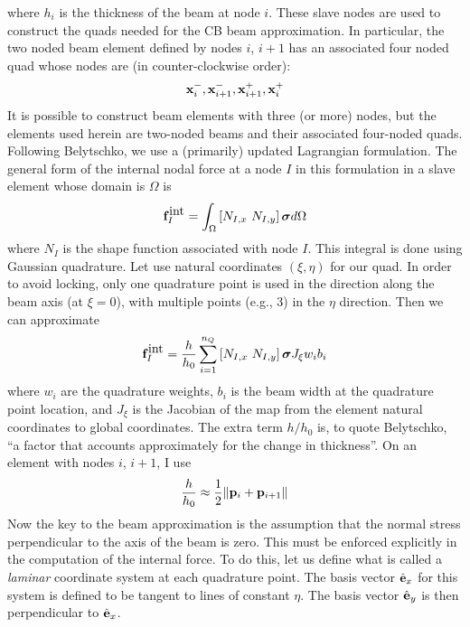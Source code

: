 \documentclass{article}
\begin{document}
where $h_i$ is the thickness of the beam at node $i$.
These slave nodes are used to construct the quads needed for the CB beam approximation.
In particular, the two noded beam element defined by nodes $i$, $i+1$ has an associated four noded quad whose nodes are (in counter-clockwise order):
\[ {\bf x}_i^-, {\bf x}_{i+1}^-,  {\bf x}_{i+1}^+, {\bf x}_i^+ \]
It is possible to construct beam elements with three (or more) nodes, but the elements used herein are two-noded beams and their associated four-noded quads.
Following Belytschko, we use a (primarily) updated Lagrangian formulation.  
The general form of the internal nodal force at a node $I$ in this formulation in a slave element whose domain is $\Omega$ is
\begin{equation} {\bf f}_I^{\mbox{int}} = \int _{\Omega} \left[ N_{I,x} \ N_{I,y} \right] {\boldsymbol \sigma} d\Omega \label{eq:eq6900} \end{equation}
where $N_I$ is the shape function associated with node $I$.  
This integral is done using Gaussian quadrature.  
Let use natural coordinates $(\xi, \eta)$ for our quad.  
In order to avoid locking, only one quadrature point is used in the direction along the beam axis (at $\xi = 0$), with multiple points (e.g., 3) in the $\eta$ direction.  
Then we can approximate
\begin{equation}  {\bf f}_I^{\mbox{int}} = \frac{h}{h_0} \sum_{i=1}^{n_Q}  \left[N_{I,x} \ N_{I,y}\right] {\boldsymbol \sigma} J_{\xi} w_i b_i \label{eq:eq7000} \end{equation}
where $w_i$ are the quadrature weights, $b_i$ is the beam width at the quadrature point location, and $J_{\xi}$ is the Jacobian of the map from the element natural coordinates to global coordinates. 
The extra term $h/h_0$ is, to quote Belytschko, ``a factor that accounts approximately for the change in thickness''. 
On an element with nodes $i$, $i+1$, I use 
\begin{equation} \frac{h}{h_0} \approx \frac{1}{2}\|{\bf p}_i + {\bf p}_{i+1} \| \label{eq:eq7100} \end{equation}
Now the key to the beam approximation is the assumption that the normal stress perpendicular to the axis of the beam is zero.  
This must be enforced explicitly in the computation of the internal force.  
To do this, let us define what is called a \emph{laminar} coordinate system at each quadrature point.  
The basis vector $\hat{\bf e}_x$ for this system is defined to be tangent to lines of constant $\eta$.  
The basis vector $\hat{\bf e}_y$ is then perpendicular to  $\hat{\bf e}_x$.
\end{document}
